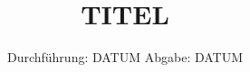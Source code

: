 

\subject{VERSUCH NUMMER}
\title{TITEL}
\date{%
  Durchführung: DATUM
  \hspace{3em}
  Abgabe: DATUM
}



\maketitle
\thispagestyle{empty}
\tableofcontents
\newpage
\setcounter{page}{1}



%




\printbibliography{}


